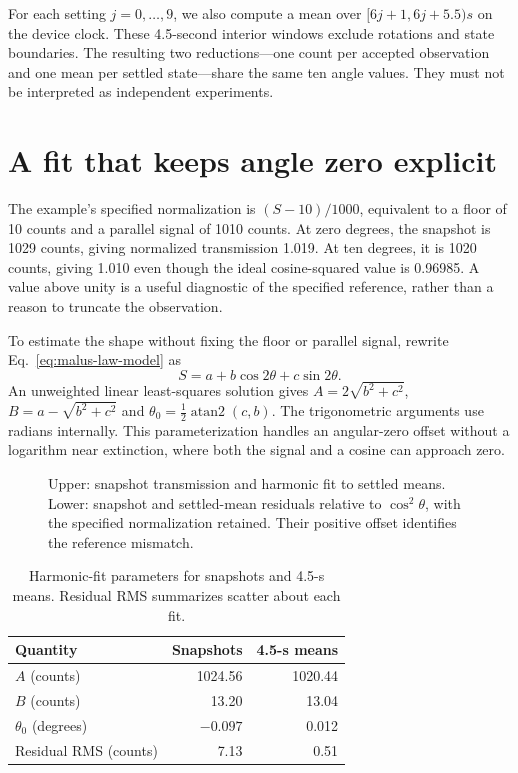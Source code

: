 For each setting $j=0,\ldots,9$, we also compute a mean over $[6j+1,6j+5.5)\unit{s}$ on the device clock. These 4.5-second interior windows exclude rotations and state boundaries. The resulting two reductions---one count per accepted observation and one mean per settled state---share the same ten angle values. They must not be interpreted as independent experiments.

\section{A fit that keeps angle zero explicit}
The example's specified normalization is $(S-10)/1000$, equivalent to a floor of 10 counts and a parallel signal of 1010 counts. At zero degrees, the snapshot is 1029 counts, giving normalized transmission 1.019. At ten degrees, it is 1020 counts, giving 1.010 even though the ideal cosine-squared value is 0.96985. A value above unity is a useful diagnostic of the specified reference, rather than a reason to truncate the observation.

To estimate the shape without fixing the floor or parallel signal, rewrite Eq.~\eqref{eq:malus-law-model} as
\begin{equation}
 S=a+b\cos2\theta+c\sin2\theta.
 \label{eq:malus-law-harmonic}
\end{equation}
An unweighted linear least-squares solution gives $A=2\sqrt{b^2+c^2}$, $B=a-\sqrt{b^2+c^2}$ and $\theta_0=\tfrac12\operatorname{atan2}(c,b)$. The trigonometric arguments use radians internally. This parameterization handles an angular-zero offset without a logarithm near extinction, where both the signal and a cosine can approach zero.

\begin{figure}[!htbp]
\centering
\caption{Upper: snapshot transmission and harmonic fit to settled means. Lower: snapshot and settled-mean residuals relative to $\cos^2\theta$, with the specified normalization retained. Their positive offset identifies the reference mismatch.}
\label{fig:malus-law-example}
\end{figure}

\begin{table}[!htbp]
\caption{Harmonic-fit parameters for snapshots and 4.5-s means. Residual RMS summarizes scatter about each fit.}
\label{tab:malus-law-values}
\centering\footnotesize
\begin{tabular}{@{}lrr@{}}\toprule
Quantity & Snapshots & 4.5-s means\\\midrule
$A$ (counts) & 1024.56 & 1020.44\\
$B$ (counts) & 13.20 & 13.04\\
$\theta_0$ (degrees) & $-0.097$ & 0.012\\
Residual RMS (counts) & 7.13 & 0.51\\\bottomrule
\end{tabular}
\end{table}

